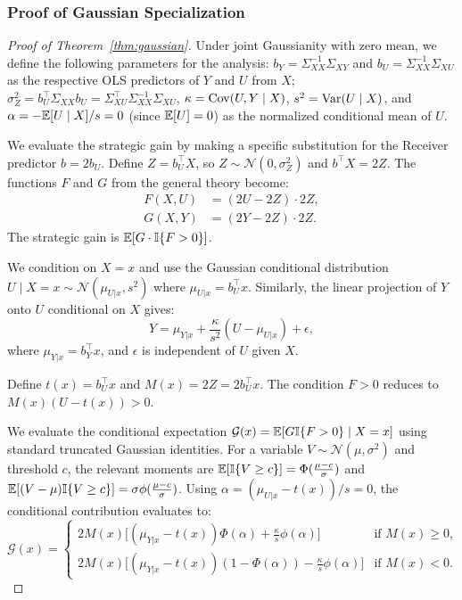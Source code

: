 \subsubsection{Proof of Gaussian Specialization}
\label{app:gaussian}

\begin{proof}[Proof of Theorem~\ref{thm:gaussian}]
Under joint Gaussianity with zero mean, we define the following parameters for the analysis: $b_Y = \Sigma_{XX}^{-1}\Sigma_{XY}$ and $b_U = \Sigma_{XX}^{-1}\Sigma_{XU}$ as the respective OLS predictors of $Y$ and $U$ from $X$; $\sigma_Z^2 = b_U^\top \Sigma_{XX} b_U = \Sigma_{XU}^\top \Sigma_{XX}^{-1}\Sigma_{XU}$, $\kappa = \operatorname{Cov}(U, Y \mid X)$, $s^2 = \operatorname{Var}(U \mid X)$, and $\alpha = -\mathbb{E}[U \mid X] / s = 0$ (since $\mathbb{E}[U]=0$) as the normalized conditional mean of $U$.

We evaluate the strategic gain by making a specific substitution for the Receiver predictor $b = 2b_U$. Define $Z = b_U^\top X$, so $Z \sim \mathcal{N}(0, \sigma_Z^2)$ and $b^\top X = 2Z$. The functions $F$ and $G$ from the general theory become:
\begin{align*}
  F(X,U) &= (2U - 2Z) \cdot 2Z, \\
  G(X,Y) &= (2Y - 2Z) \cdot 2Z.
\end{align*}
The strategic gain is $\mathbb{E}[G \cdot \mathbb{I}\{F > 0\}]$.

We condition on $X = x$ and use the Gaussian conditional distribution $U \mid X = x \sim \mathcal{N}(\mu_{U|x}, s^2)$ where $\mu_{U|x} = b_U^\top x$. Similarly, the linear projection of $Y$ onto $U$ conditional on $X$ gives:
\begin{equation*}
  Y = \mu_{Y|x} + \frac{\kappa}{s^2}(U - \mu_{U|x}) + \epsilon,
\end{equation*}
where $\mu_{Y|x} = b_Y^\top x$, and $\epsilon$ is independent of $U$ given $X$.

Define $t(x) = b_U^\top x$ and $M(x) = 2Z = 2b_U^\top x$. The condition $F > 0$ reduces to $M(x)(U - t(x)) > 0$.

We evaluate the conditional expectation $\mathcal{G}(x) = \mathbb{E}[G\mathbb{I}\{F>0\} \mid X=x]$ using standard truncated Gaussian identities. For a variable $V \sim \mathcal{N}(\mu, \sigma^2)$ and threshold $c$, the relevant moments are $\mathbb{E}[\mathbb{I}\{V \ge c\}] = \Phi(\frac{\mu-c}{\sigma})$ and $\mathbb{E}[(V - \mu)\mathbb{I}\{V \ge c\}] = \sigma\phi(\frac{\mu-c}{\sigma})$. Using $\alpha = (\mu_{U|x} - t(x))/s = 0$, the conditional contribution evaluates to:
\begin{equation*}
  \mathcal{G}(x) = 
  \begin{cases}
    2M(x)\Big[(\mu_{Y|x} - t(x))\Phi(\alpha) + \frac{\kappa}{s}\phi(\alpha)\Big] & \text{if } M(x) \ge 0, \\
    2M(x)\Big[(\mu_{Y|x} - t(x))(1-\Phi(\alpha)) - \frac{\kappa}{s}\phi(\alpha)\Big] & \text{if } M(x) < 0.
  \end{cases}
\end{equation*}


\end{proof}

